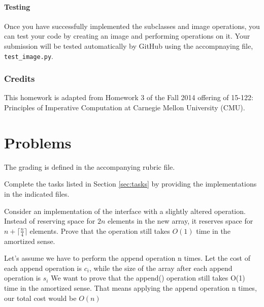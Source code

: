 \documentclass[addpoints]{exam}
\begin{document}
\subsection{Testing}

Once you have successfully implemented the subclasses and image operations, you can test your code by creating an image and performing operations on it. Your submission will be tested automatically by GitHub using the accompnaying  file, \texttt{test\_image.py}.


\section{Credits}

This homework is adapted from Homework 3 of the Fall 2014 offering of 15-122: Principles of Imperative Computation at Carnegie Mellon University (CMU).


\part{Problems}

The grading is defined in the accompanying rubric file.
\begin{questions}
   Complete the tasks listed in Section \ref{sec:tasks} by providing the implementations in the indicated files.


  Consider an  implementation of the  interface with a slightly altered  operation. Instead of reserving space for $2n$ elements in the new array, it reserves space for $n + \lceil \frac{n}{4} \rceil$ elements. Prove that the  operation still takes $O(1)$ time in the amortized sense.
  \begin{solution}
    
    Let's assume we have to perform the append operation n times. 
    Let the cost of each append operation is $c_i$, while the size of the array after each append operation is $s_i$
    We want to prove that the append() operation still takes O(1) time in the amortized sense.
    That means applying the append operation n times, our total cost would be $O(n)$

  \end{solution}

\end{questions}
\end{document}
